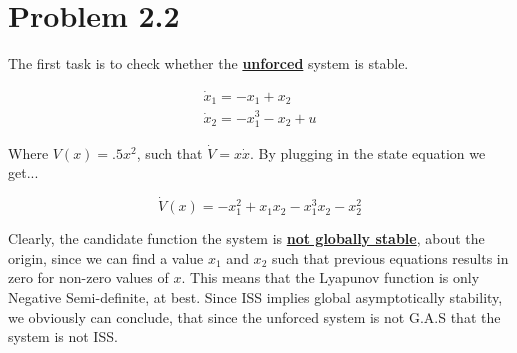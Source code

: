 \section*{Problem 2.2}



The first task is to check whether the \textbf{\underline{unforced}} system is stable.

$$
\begin{array}{l}
\dot{x}_{1}=-x_{1}+x_{2} \\
\dot{x}_{2}=-x_{1}^{3}-x_{2}+u
\end{array}
$$

\noindent Where $V(x) = .5x^2$, such that $\dot{V} = x\dot{x}$. By plugging in the state equation we get...

$$
\dot{V}(x) = -x_1^2 + x_1x_2 - x_1^3x_2 -x_2^2
$$

\noindent Clearly, the candidate function the system is \underline{\textbf{not globally stable}}, about the origin, since we can find a value $x_1$ and $x_2$ such that previous equations results in zero for non-zero values of $x$. This means that the Lyapunov function is only Negative Semi-definite, at best. Since ISS implies global asymptotically stability, we obviously can conclude, that since the unforced system is not G.A.S that the system is not ISS.
